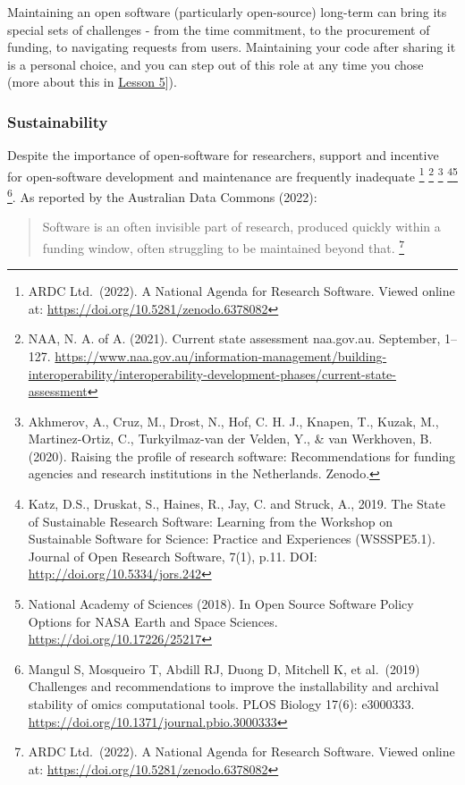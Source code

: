 \documentclass[
  letterpaper,
  DIV=11,
  numbers=noendperiod]{scrreport}
\begin{document}
Maintaining an open software (particularly open-source) long-term can
bring its special sets of challenges - from the time commitment, to the
procurement of funding, to navigating requests from users. Maintaining
your code after sharing it is a personal choice, and you can step out of
this role at any time you chose (more about this in \href{link}{Lesson
5}{]}).

\hypertarget{sustainability}{%
\subsubsection{Sustainability}\label{sustainability}}

Despite the importance of open-software for researchers, support and
incentive for open-software development and maintenance are frequently
inadequate \footnote{ARDC Ltd.~(2022). A National Agenda for Research
  Software. Viewed online at:
  \url{https://doi.org/10.5281/zenodo.6378082}} \footnote{NAA, N. A. of
  A. (2021). Current state assessment \textbar{} naa.gov.au. September,
  1--127.
  \url{https://www.naa.gov.au/information-management/building-interoperability/interoperability-development-phases/current-state-assessment}}
\footnote{Akhmerov, A., Cruz, M., Drost, N., Hof, C. H. J., Knapen, T.,
  Kuzak, M., Martinez-Ortiz, C., Turkyilmaz-van der Velden, Y., \& van
  Werkhoven, B. (2020). Raising the profile of research software:
  Recommendations for funding agencies and research institutions in the
  Netherlands. Zenodo.} \footnote{Katz, D.S., Druskat, S., Haines, R.,
  Jay, C. and Struck, A., 2019. The State of Sustainable Research
  Software: Learning from the Workshop on Sustainable Software for
  Science: Practice and Experiences (WSSSPE5.1). Journal of Open
  Research Software, 7(1), p.11. DOI:
  \url{http://doi.org/10.5334/jors.242}}\footnote{National Academy of
  Sciences (2018). In Open Source Software Policy Options for NASA Earth
  and Space Sciences. \url{https://doi.org/10.17226/25217}} \footnote{Mangul
  S, Mosqueiro T, Abdill RJ, Duong D, Mitchell K, et al.~(2019)
  Challenges and recommendations to improve the installability and
  archival stability of omics computational tools. PLOS Biology 17(6):
  e3000333. \url{https://doi.org/10.1371/journal.pbio.3000333}}. As
reported by the Australian Data Commons (2022):

\begin{quote}
Software is an often invisible part of research, produced quickly within
a funding window, often struggling to be maintained beyond that.
\footnote{ARDC Ltd.~(2022). A National Agenda for Research Software.
  Viewed online at: \url{https://doi.org/10.5281/zenodo.6378082}}
\end{quote}
\end{document}
